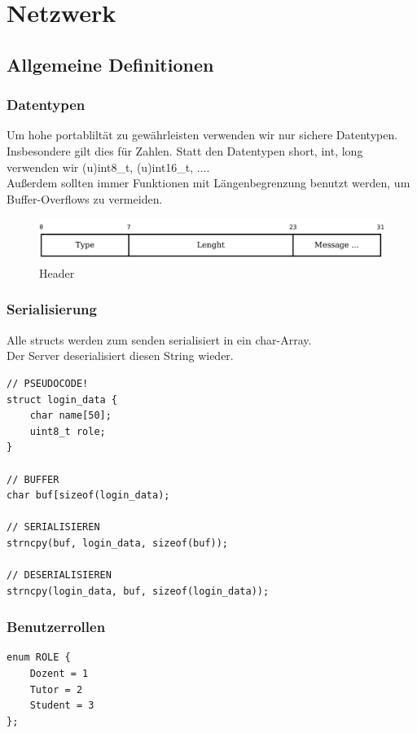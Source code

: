 \section{Netzwerk}

\subsection{Allgemeine Definitionen}
\subsubsection{Datentypen}
Um hohe portabliltät zu gewährleisten verwenden wir nur sichere Datentypen.
Insbesondere gilt dies für Zahlen. Statt den Datentypen short, int, long verwenden
wir (u)int8\_t, (u)int16\_t, ....\\
Außerdem sollten immer Funktionen mit Längenbegrenzung benutzt werden, 
um Buffer-Overflows zu vermeiden.

\begin{figure}[ht!]
 \centering
 \includegraphics[width=\textwidth,keepaspectratio=true]{Bilder/header.pdf}
 \caption{Header}
 \label{Header}
\end{figure}

\subsubsection{Serialisierung}
Alle structs werden zum senden serialisiert in ein char-Array. \\
Der Server deserialisiert diesen String wieder.

\begin{lstlisting}
// PSEUDOCODE!
struct login_data {
    char name[50];
    uint8_t role;
}

// BUFFER
char buf[sizeof(login_data);

// SERIALISIEREN
strncpy(buf, login_data, sizeof(buf));

// DESERIALISIEREN
strncpy(login_data, buf, sizeof(login_data));
\end{lstlisting}

\subsubsection{Benutzerrollen}
\begin{lstlisting}
enum ROLE {
    Dozent = 1
    Tutor = 2
    Student = 3
};
\end{lstlisting}

